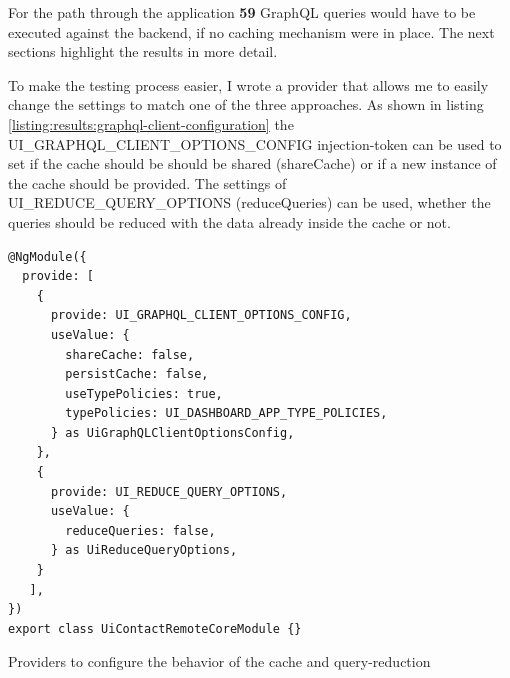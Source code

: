 For the path through the application \textbf{59} GraphQL queries would have to be executed against the backend, if no caching mechanism were in place. The next sections highlight the results in more detail.

To make the testing process easier, I wrote a provider that allows me to easily change the settings to match one of the three approaches. As shown in listing \ref{listing:results:graphql-client-configuration} the UI\_GRAPHQL\_CLIENT\_OPTIONS\_CONFIG injection-token can be used to set if the cache should be should be shared (shareCache) or if a new instance of the cache should be provided. The settings of UI\_REDUCE\_QUERY\_OPTIONS (reduceQueries) can be used, whether the queries should be reduced with the data already inside the cache or not.

\ifshowListings
\begin{listing}[H]
\begin{verbatim}
@NgModule({
  provide: [
    {
      provide: UI_GRAPHQL_CLIENT_OPTIONS_CONFIG,  
      useValue: {  
        shareCache: false,  
        persistCache: false,  
        useTypePolicies: true,  
        typePolicies: UI_DASHBOARD_APP_TYPE_POLICIES,  
      } as UiGraphQLClientOptionsConfig,  
    },  
    {  
      provide: UI_REDUCE_QUERY_OPTIONS,  
      useValue: {  
        reduceQueries: false,  
      } as UiReduceQueryOptions,  
    }
   ],
})
export class UiContactRemoteCoreModule {}
\end{verbatim}
\caption{Providers to configure the behavior of the cache and query-reduction}\label{listing:results:graphql-client-configuration}
\end{listing}
\fi

